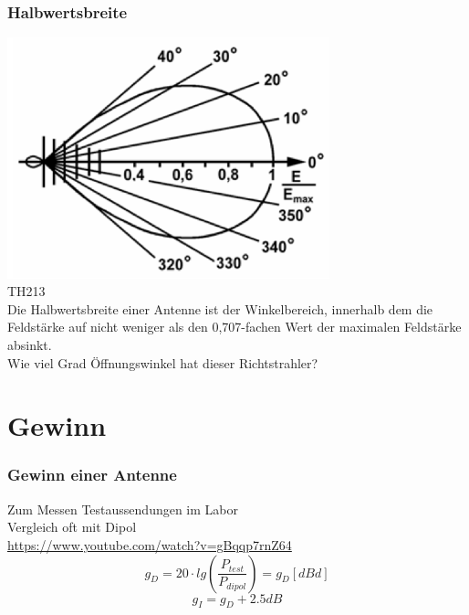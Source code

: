 \begin{frame}
    \frametitle{Halbwertsbreite}
        \begin{center}
        \includegraphics[width=0.7\textwidth]{a09/TH213.png}\\
        \tiny \hyperlink{refs}{\cite{bna}} TH213 \\[1em] 
		\large Die Halbwertsbreite einer Antenne ist der Winkelbereich, innerhalb dem 
die Feldstärke auf nicht weniger als den 0,707-fachen Wert der maximalen Feldstärke absinkt.\\[1em] Wie viel Grad Öffnungswinkel hat dieser Richtstrahler?
    \end{center}
\end{frame}

\section*{Gewinn}

\begin{frame}
    \frametitle{Gewinn einer Antenne}
    \begin{center}
		\large Zum Messen Testaussendungen im Labor\\
		Vergleich oft mit Dipol\\
		\url{https://www.youtube.com/watch?v=gBqqp7rnZ64}\\[2em]
		$$g_D = 20 \cdot lg(\frac{P_{test}}{P_{dipol}}) = g_D[dBd]$$	
		$$g_I = g_D + 2.5dB$$	
    \end{center}
\end{frame}

